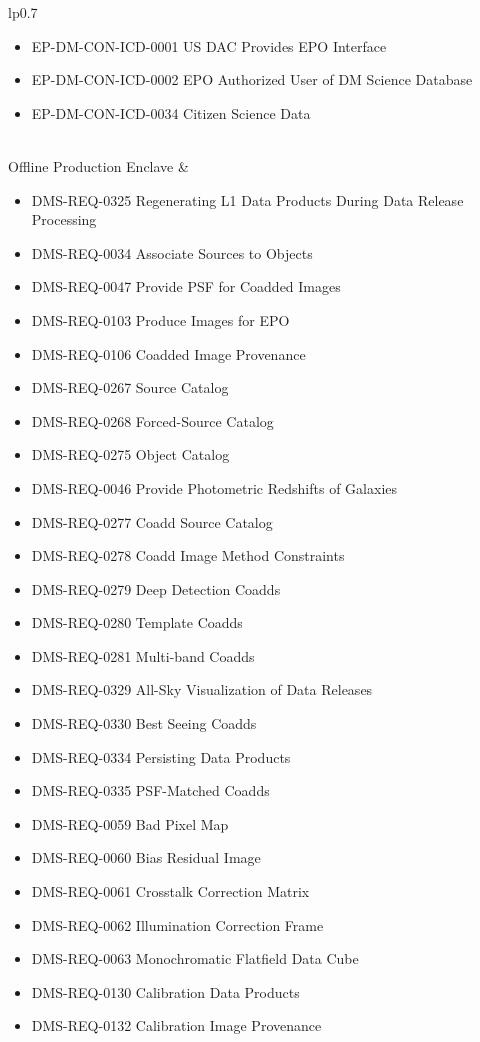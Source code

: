 \begin{xtabular}{lp{0.7\textwidth}}
\begin{itemize}
\item EP-DM-CON-ICD-0001 US DAC Provides EPO Interface
\item EP-DM-CON-ICD-0002 EPO Authorized User of DM Science Database
\item EP-DM-CON-ICD-0034 Citizen Science Data
\end{itemize} \\ \hline
Offline Production Enclave &
\begin{itemize}DMS-REQ-0004 Nightly Data Accessible Within 24 hrs
\item DMS-REQ-0325 Regenerating L1 Data Products During Data Release Processing
\item DMS-REQ-0034 Associate Sources to Objects
\item DMS-REQ-0047 Provide PSF for Coadded Images
\item DMS-REQ-0103 Produce Images for EPO
\item DMS-REQ-0106 Coadded Image Provenance
\item DMS-REQ-0267 Source Catalog
\item DMS-REQ-0268 Forced-Source Catalog
\item DMS-REQ-0275 Object Catalog
\item DMS-REQ-0046 Provide Photometric Redshifts of Galaxies
\item DMS-REQ-0277 Coadd Source Catalog
\item DMS-REQ-0278 Coadd Image Method Constraints
\item DMS-REQ-0279 Deep Detection Coadds
\item DMS-REQ-0280 Template Coadds
\item DMS-REQ-0281 Multi-band Coadds
\item DMS-REQ-0329 All-Sky Visualization of Data Releases
\item DMS-REQ-0330 Best Seeing Coadds
\item DMS-REQ-0334 Persisting Data Products
\item DMS-REQ-0335 PSF-Matched Coadds
\item DMS-REQ-0059 Bad Pixel Map
\item DMS-REQ-0060 Bias Residual Image
\item DMS-REQ-0061 Crosstalk Correction Matrix
\item DMS-REQ-0062 Illumination Correction Frame
\item DMS-REQ-0063 Monochromatic Flatfield Data Cube
\item DMS-REQ-0130 Calibration Data Products
\item DMS-REQ-0132 Calibration Image Provenance

\end{itemize}
\end{xtabular}
